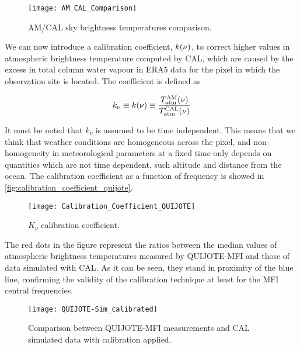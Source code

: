 \begin{figure}
        \centering
        \texttt{[image: AM\_CAL\_Comparison]}
        \caption{AM/CAL sky brightness temperatures comparison.}
        \label{fig:am_cal_comparison}
\end{figure}

We can now introduce a calibration coefficient, $k\qty(\nu)$, to correct
higher values in atmospheric brightness temperature computed by CAL, which
are caused by the excess in total column water vapour in ERA5 data for
the pixel in which the observation site is located. The coefficient is defined as

\begin{equation}
        k_\nu \equiv  k\qty(\nu) \equiv
        \frac{T^\text{AM}_\text{atm}\qty(\nu)}{
        T^\text{CAL}_\text{atm}\qty(\nu)}
\end{equation}

It must be noted that $k_\nu$ is assumed to be time independent. This means
that we think that weather conditions are homogeneous across the pixel, and
non-homogeneity in meteorological parameters at a fixed time only depends
on quantities which are not time dependent, such altitude and distance from
the ocean. The calibration coefficient as a function of frequency is showed
in \autoref{fig:calibration_coefficient_quijote}.

\begin{figure}
        \centering
        \texttt{[image: Calibration\_Coefficient\_QUIJOTE]}
        \caption{$K_\nu$ calibration coefficient.}
        \label{fig:calibration_coefficient_quijote}
\end{figure}

The red dots in the figure represent the ratios between the median values of
atmospheric brightness temperatures measured by QUIJOTE-MFI and those of data
simulated with CAL. As it can be seen, they stand in proximity of the
blue line, confirming the validity of the calibration technique at least
for the MFI central frequencies.

\begin{figure}
        \centering
        \texttt{[image: QUIJOTE-Sim\_calibrated]}
        \caption{Comparison between QUIJOTE-MFI measurements and
        CAL simulated data with calibration applied.}
        \label{fig:quijote_sim_calibrated}
\end{figure}

